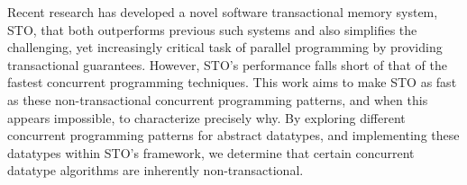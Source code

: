 Recent research has developed a novel software transactional memory system, STO, that both outperforms previous such systems and also simplifies the challenging, yet increasingly critical task of parallel programming by providing transactional guarantees. However, STO's performance falls short of that of the fastest concurrent programming techniques. This work aims to make STO as fast as these non-transactional concurrent programming patterns, and when this appears impossible, to characterize precisely why. By exploring different concurrent programming patterns for abstract datatypes, and implementing these datatypes within STO's framework, we determine that certain concurrent datatype algorithms are inherently non-transactional.
